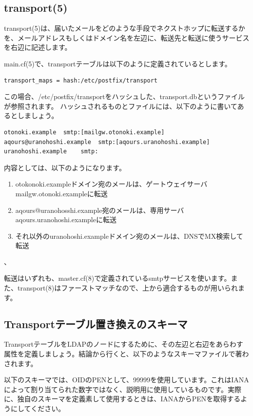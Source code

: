\subsection{transport(5)}

transport(5)は、届いたメールをどのような手段でネクストホップに転送するかを、メールアドレスもしくはドメイン名を左辺に、転送先と転送に使うサービスを右辺に記述します。

main.cf(5)で、transportテーブルは以下のように定義されているとします。

\begin{verbatim}
transport_maps = hash:/etc/postfix/transport
\end{verbatim}

この場合、/etc/postfix/transportをハッシュした、transport.dbというファイルが参照されます。
ハッシュされるものとファイルには、以下のように書いてあるとしましょう。

\begin{verbatim}
otonoki.example  smtp:[mailgw.otonoki.example]
aqours@uranohoshi.example  smtp:[aqours.uranohoshi.example]
uranohoshi.example    smtp:
\end{verbatim}

内容としては、以下のようになります。

\begin{enumerate}
  \item otokonoki.exampleドメイン宛のメールは、ゲートウェイサーバmailgw.otonoki.exampleに転送
  \item aqours@uranohosshi.example宛のメールは、専用サーバaqours.uranohoshi.exampleに転送
  \item それ以外のuranohoshi.exampleドメイン宛のメールは、DNSでMX検索して転送
\end{enumerate}、

転送はいずれも、master.cf(8)で定義されているsmtpサービスを使います。また、transport(8)はファーストマッチなので、上から適合するものが用いられます。

\subsection{Transportテーブル置き換えのスキーマ}
TransportテーブルをLDAPのノードにするために、その左辺と右辺をあらわす属性を定義しましょう。結論から行くと、以下のようなスキーマファイルで著わされます。

以下のスキーマでは、OIDのPENとして、99999を使用しています。これはIANAによって割り当てられた数字ではなく、説明用に使用しているものです。実際に、独自のスキーマを定義素して使用するときは、IANAからPENを取得するようにしてください。


